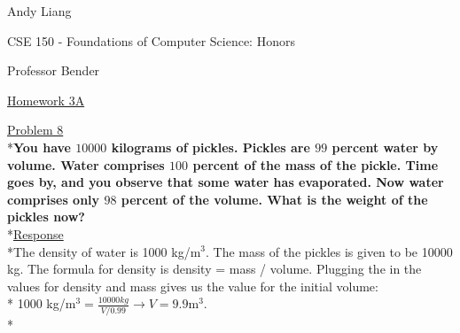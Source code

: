 \documentclass[12pt]{article}
\begin{document}
\begin{flushleft}
Andy Liang

CSE 150 - Foundations of Computer Science: Honors

Professor Bender
\end{flushleft}
\medskip
\centerline{\uline{Homework 3A}}
\bigskip\bigskip

\noindent
\uline{Problem 8}
\\*\textbf{You have $10000$ kilograms of pickles. Pickles are $99$ percent water by volume. Water comprises $100$ percent of the mass of the pickle. Time goes by, and you observe that some water has evaporated. Now water comprises only $98$ percent of the volume. What is the weight of the pickles now?}
\smallskip
\\*\uline{Response}
\\*The density of water is 1000 kg/m$^3$. The mass of the pickles is given to be 10000 kg. The formula for density is density = mass / volume. Plugging the in the values for density and mass gives us the value for the initial volume:
\\* 1000 kg/m$^3 = \frac{10000kg}{V/0.99} \rightarrow V = 9.9$m$^3$.
\\* 
\bigskip
\end{document}

